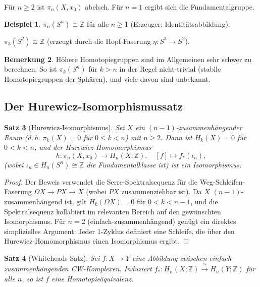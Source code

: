\documentclass[12pt,a4paper]{amsart}
\newtheorem{theorem}{Satz}[section]
\theoremstyle{definition}
\newtheorem{example}[theorem]{Beispiel}
\newtheorem{remark}[theorem]{Bemerkung}
\begin{document}
F\"ur $n \geq 2$ ist $\pi_n(X, x_0)$ abelsch. F\"ur $n = 1$ ergibt sich
die Fundamentalgruppe.

\begin{example}
$\pi_n(S^n) \cong \mathbb{Z}$ f\"ur alle $n \geq 1$ (Erzeuger: Identit\"atsabbildung).

$\pi_3(S^2) \cong \mathbb{Z}$ (erzeugt durch die Hopf-Faserung $\eta\colon S^3 \to S^2$).
\end{example}

\begin{remark}
H\"ohere Homotopiegruppen sind im Allgemeinen sehr schwer zu berechnen.
So ist $\pi_k(S^n)$ f\"ur $k > n$ in der Regel nicht-trivial (stabile
Homotopiegruppen der Sph\"aren), und viele davon sind unbekannt.
\end{remark}

\subsection{Der Hurewicz-Isomorphismussatz}

\begin{theorem}[Hurewicz-Isomorphismus]
\label{thm:hurewicz}
Sei $X$ ein $(n-1)$-zusammenh\"angender Raum (d.\,h. $\pi_k(X) = 0$
f\"ur $0 \leq k < n$) mit $n \geq 2$. Dann ist $H_k(X) = 0$ f\"ur $0 < k < n$,
und der \emph{Hurewicz-Homomorphismus}
\[
  h\colon \pi_n(X, x_0) \to H_n(X;\mathbb{Z}),
  \quad [f] \mapsto f_*(\iota_n),
\]
(wobei $\iota_n \in H_n(S^n) \cong \mathbb{Z}$ die Fundamentalklasse ist)
ist ein Isomorphismus.
\end{theorem}
\begin{proof}
Der Beweis verwendet die Serre-Spektralsequenz f\"ur die Weg-Schleifen-Faserung
$\Omega X \to PX \to X$ (wobei $PX$ zusammenziehbar ist). Da $X$ $(n-1)$-zusammenh\"angend
ist, gilt $H_k(\Omega X) = 0$ f\"ur $0 < k < n-1$, und die Spektralsequenz
kollabiert im relevanten Bereich auf den gew\"unschten Isomorphismus.
F\"ur $n=2$ (einfach-zusammenh\"angend) gen\"ugt ein direktes simplizielles Argument:
Jeder 1-Zyklus definiert eine Schleife, die \"uber den Hurewicz-Homomorphismus
einen Isomorphismus ergibt.
\end{proof}

\begin{theorem}[Whiteheads Satz]
Sei $f\colon X \to Y$ eine Abbildung zwischen einfach-zusammenh\"angenden
CW-Komplexen. Induziert $f_*\colon H_n(X;\mathbb{Z}) \xrightarrow{\cong} H_n(Y;\mathbb{Z})$
f\"ur alle $n$, so ist $f$ eine Homotopie\"aquivalenz.
\end{theorem}
\end{document}
